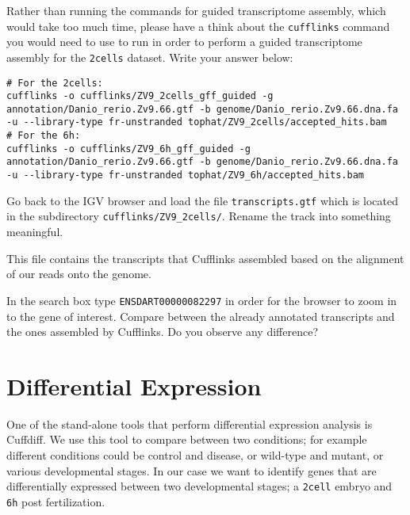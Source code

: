 \begin{questions}
Rather than running the commands for guided transcriptome assembly, which would
take too much time, please have a think about the \texttt{cufflinks} command you would
need to use to run in order to perform a guided transcriptome assembly
for the \texttt{2cells} dataset. Write your answer below:
\begin{answer}
\begin{lstlisting}
# For the 2cells:
cufflinks -o cufflinks/ZV9_2cells_gff_guided -g annotation/Danio_rerio.Zv9.66.gtf -b genome/Danio_rerio.Zv9.66.dna.fa -u --library-type fr-unstranded tophat/ZV9_2cells/accepted_hits.bam
# For the 6h:
cufflinks -o cufflinks/ZV9_6h_gff_guided -g annotation/Danio_rerio.Zv9.66.gtf -b genome/Danio_rerio.Zv9.66.dna.fa -u --library-type fr-unstranded tophat/ZV9_6h/accepted_hits.bam
\end{lstlisting}
\end{answer}

\end{questions}

\begin{steps}
Go back to the IGV browser and load the file \texttt{transcripts.gtf} which is located
in the subdirectory \texttt{cufflinks/ZV9\_2cells/}. Rename the track into
something meaningful.

This file contains the transcripts that Cufflinks assembled based on the
alignment of our reads onto the genome.
\end{steps}

\begin{questions}
In the search box type \texttt{ENSDART00000082297} in order for the browser to zoom in
to the gene of interest. Compare between the already annotated transcripts and
the ones assembled by Cufflinks. Do you observe any difference?
\begin{answer}
\end{answer}

\end{questions}

\section{Differential Expression}
One of the stand-alone tools that perform differential expression analysis is
Cuffdiff. We use this tool to compare between two conditions; for example
different conditions could be control and disease, or wild-type and mutant, or
various developmental stages. In our case we want to identify genes that are
differentially expressed between two developmental stages; a \texttt{2cell}
embryo and \texttt{6h} post fertilization.


